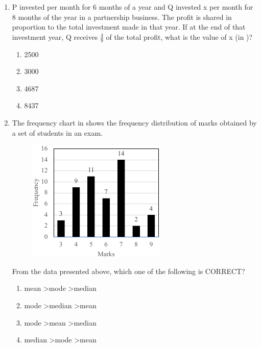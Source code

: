 \documentclass[journal,12pt,onecolumn]{IEEEtran}
\theoremstyle{remark}
\begin{document}
\begin{enumerate}
\item
P invested  per month for 6 months of a year and Q invested \rupee x per month for 8 months of the year in a partnership business. The profit is shared in proportion to the total investment made in that year. If at the end of that investment year, Q receives $\frac{4}{9}$ of the total profit, what is the value of x (in \rupee)?
\begin{enumerate}
    \item 2500
    \item 3000
    \item 4687
    \item 8437
\end{enumerate}


\item
The frequency chart in  shows the frequency distribution of marks obtained by a set of students in an exam.
\begin{center}
    \begin{figure}[H] \caption{} \label{fig:8}\includegraphics{figs/8.png}\end{figure}%
\end{center}
From the data presented above, which one of the following is CORRECT?
\begin{enumerate}
    \item mean \textgreater mode \textgreater median
    \item mode \textgreater median \textgreater mean
    \item mode \textgreater mean \textgreater median
    \item median \textgreater mode \textgreater mean
\end{enumerate}



\end{enumerate}
\end{document}

